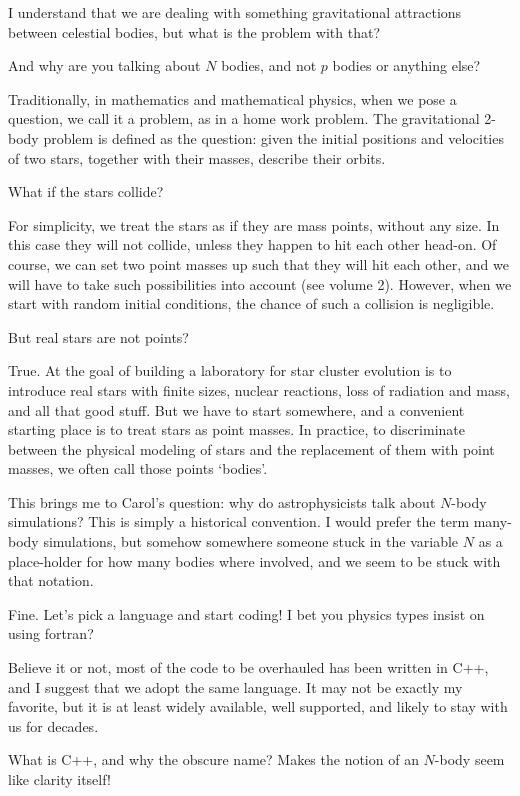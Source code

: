 \bob
I understand that we are dealing with something gravitational
attractions between celestial bodies, but what is the problem with that?

\carol
And why are you talking about $N$ bodies, and not $p$ bodies or
anything else?

\alice
Traditionally, in mathematics and mathematical physics, when we pose a
question, we call it a problem, as in a home work problem.  The
gravitational 2-body problem is defined as the question: given the
initial positions and velocities of two stars, together with their
masses, describe their orbits.

\bob
What if the stars collide?

\alice
For simplicity, we treat the stars as if they are mass points, without
any size.  In this case they will not collide, unless they happen to
hit each other head-on.  Of course, we can set two point masses up
such that they will hit each other, and we will have to take such
possibilities into account (see volume 2).  However, when we start
with random initial conditions, the chance of such a collision is
negligible.

\carol
But real stars are not points?

\alice
True.  At the goal of building a laboratory for star cluster evolution
is to introduce real stars with finite sizes, nuclear reactions, loss
of radiation and mass, and all that good stuff.  But we have to start
somewhere, and a convenient starting place is to treat stars as point
masses.  In practice, to discriminate between the physical modeling of
stars and the replacement of them with point masses, we often call
those points `bodies'.

This brings me to Carol's question: why do astrophysicists talk about
$N$-body simulations?  This is simply a historical convention.  I
would prefer the term many-body simulations, but somehow somewhere
someone stuck in the variable $N$ as a place-holder for how many
bodies where involved, and we seem to be stuck with that notation.

\carol
Fine.  Let's pick a language and start coding!  I bet you physics
types insist on using fortran?

\alice
Believe it or not, most of the code to be overhauled has been written
in C++, and I suggest that we adopt the same language.  It may not be
exactly my favorite, but it is at least widely available, well
supported, and likely to stay with us for decades.

\bob
What is C++, and why the obscure name?  Makes the notion of an $N$-body
seem like clarity itself!


